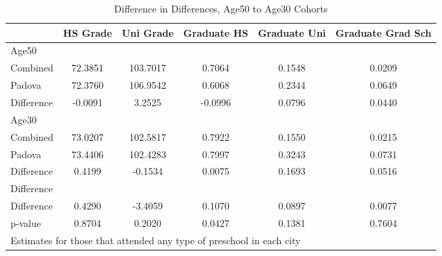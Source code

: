 \begin{table}[htbp]\centering
\caption{Difference in Differences, Age50 to Age30 Cohorts}
\begin{tabular}{l*{5}{c}}
\hline\hline
            &    HS Grade&   Uni Grade& Graduate HS&Graduate Uni&Graduate Grad Sch\\
\hline
Age50       &            &            &            &            &            \\
Combined    &     72.3851&    103.7017&      0.7064&      0.1548&      0.0209\\
Padova      &     72.3760&    106.9542&      0.6068&      0.2344&      0.0649\\
Difference  &     -0.0091&      3.2525&     -0.0996&      0.0796&      0.0440\\
\hline
Age30       &            &            &            &            &            \\
Combined    &     73.0207&    102.5817&      0.7922&      0.1550&      0.0215\\
Padova      &     73.4406&    102.4283&      0.7997&      0.3243&      0.0731\\
Difference  &      0.4199&     -0.1534&      0.0075&      0.1693&      0.0516\\
\hline
Difference  &            &            &            &            &            \\
Difference  &      0.4290&     -3.4059&      0.1070&      0.0897&      0.0077\\
p-value     &      0.8704&      0.2020&      0.0427&      0.1381&      0.7604\\
\hline\hline
\multicolumn{6}{l}{\footnotesize Estimates for those that attended any type of preschool in each city}\\
\end{tabular}
\end{table}
